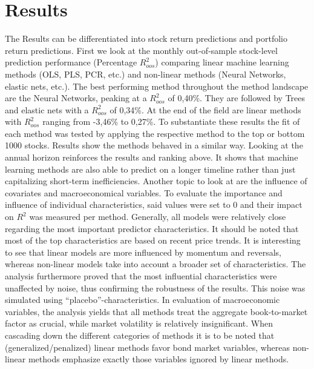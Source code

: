 \section{Results}

The Results can be differentiated into stock return predictions and portfolio return predictions.
\newline
First we look at the monthly out-of-sample stock-level prediction performance (Percentage $R^{2}_{oos}$) comparing linear machine learning methods (OLS, PLS, PCR, etc.) and non-linear methods (Neural Networks, elastic nets, etc.). The best performing method throughout the method landscape are the Neural Networks, peaking at a $R^{2}_{oos}$ of 0,40\%. They are followed by Trees and elastic nets with a $R^{2}_{oos}$ of 0,34\%. At the end of the field are linear methods with $R^{2}_{oos}$ ranging from -3,46\% to 0,27\%. To substantiate these results the fit of each method was tested by applying the respective method to the top or bottom 1000 stocks. Results show the methods behaved in a similar way.
\newline
Looking at the annual horizon reinforces the results and ranking above. It shows that machine learning methods are also able to predict on a longer timeline rather than just capitalizing short-term inefficiencies.
\newline
Another topic to look at are the influence of covariates and macroeconomical variables.
To evaluate the importance and influence of individual characteristics, said values were set to 0 and their impact on $R^{2}$ was measured per method. Generally, all models were relatively close regarding the most important predictor characteristics. It should be noted that most of the top characteristics are based on recent price trends. It is interesting to see that linear models are more influenced by momentum and reversals, whereas non-linear models take into account a broader set of characteristics. The analysis furthermore proved that the most influential characteristics were unaffected by noise, thus confirming the robustness of the results. This noise was simulated using “placebo”-characteristics.
In evaluation of macroeconomic variables, the analysis yields that all methods treat the aggregate book-to-market factor as crucial, while market volatility is relatively insignificant. When cascading down the different categories of methods it is to be noted that (generalized/penalized) linear methods favor bond market variables, whereas non-linear methods emphasize exactly those variables ignored by linear methods.
